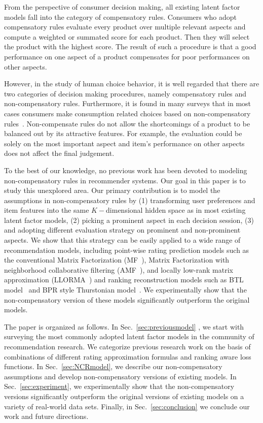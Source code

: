 \documentclass[letterpaper]{article} %
\begin{document}
From the perspective of consumer decision making, all existing latent factor models fall into the category of compensatory rules. Consumers who adopt compensatory rules evaluate every product over multiple relevant aspects and compute a weighted or summated score for each product. Then they will select the product with the highest score. The result of such a procedure is  that a good performance on one aspect of a product compensates for poor performances on other aspects. 


However, in the study of human choice behavior, it is well regarded that there are two categories of decision making procedures, namely compensatory rules and non-compensatory rules. Furthermore, it is found in many surveys that in most cases consumers make consumption related choices based on non-compensatory rules~\cite{Engel1986Consumer}. Non-compensate rules do not allow the shortcomings of a product to be balanced out by its attractive features. For example, the evaluation could be solely on the most important aspect and item's performance on other aspects does not affect the final judgement.

To the best of our knowledge, no previous work has been devoted to modeling non-compensatory rules in recommender systems. Our goal in this paper is to study this unexplored area. Our primary contribution is to model the assumptions in non-compensatory rules by (1) transforming user preferences and item features into the same $K-$dimensional hidden space as in most existing latent factor models, (2) picking a prominent aspect in each decision session, (3) and adopting different evaluation strategy on prominent and non-prominent aspects. We show that this strategy can be easily applied to a wide range of recommendation models, including point-wise rating prediction models such as the conventional Matrix Factorization (MF~\cite{Koren2009Matrix}), Matrix Factorization with neighborhood collaborative filtering (AMF~\cite{Koren2008Factorization}), and locally low-rank matrix approximation (LLORMA~\cite{Lee2013Local}) and ranking reconstruction models such as BTL model~\cite{Hunter2004MM} and BPR style  Thurstonian model~\cite{Rendle2009BPR}. We experimentally show that the non-compensatory version of these models significantly outperform the original models.

The paper is organized as follows. In Sec.~\ref{sec:previousmodel} , we start with surveying the most commonly adopted latent factor models in the community of recommendation research. We categorize previous research work on the basis of  combinations of  different rating approximation formulas and ranking aware loss functions. In Sec.~\ref{sec:NCRmodel}, we describe our non-compensatory assumptions and develop non-compensatory versions of existing models. In Sec.~\ref{sec:experiment}, we experimentally show that the non-compensatory versions significantly outperform the original versions of existing models on a variety of real-world data sets. Finally, in Sec.~\ref{sec:conclusion} we conclude our work and future directions.
\end{document}
